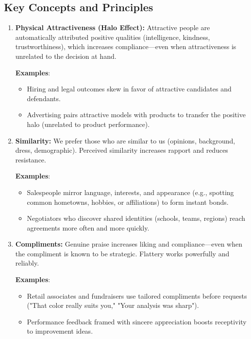 \subsection*{Key Concepts and Principles}
\begin{enumerate}
    \item \textbf{Physical Attractiveness (Halo Effect):} Attractive people are automatically attributed positive qualities (intelligence, kindness, trustworthiness), which increases compliance—even when attractiveness is unrelated to the decision at hand.
    
    \textbf{Examples}:
    \begin{itemize}
        \item Hiring and legal outcomes skew in favor of attractive candidates and defendants.
        \item Advertising pairs attractive models with products to transfer the positive halo (unrelated to product performance).
    \end{itemize}

    \item \textbf{Similarity:} We prefer those who are similar to us (opinions, background, dress, demographic). Perceived similarity increases rapport and reduces resistance.
    
    \textbf{Examples}:
    \begin{itemize}
        \item Salespeople mirror language, interests, and appearance (e.g., spotting common hometowns, hobbies, or affiliations) to form instant bonds.
        \item Negotiators who discover shared identities (schools, teams, regions) reach agreements more often and more quickly.
    \end{itemize}

    \item \textbf{Compliments:} Genuine praise increases liking and compliance—even when the compliment is known to be strategic. Flattery works powerfully and reliably.
    
    \textbf{Examples}:
    \begin{itemize}
        \item Retail associates and fundraisers use tailored compliments before requests ("That color really suits you," "Your analysis was sharp").
        \item Performance feedback framed with sincere appreciation boosts receptivity to improvement ideas.
    \end{itemize}


\end{enumerate}
